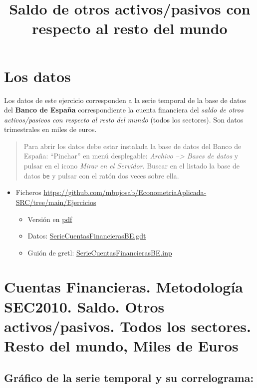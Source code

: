 \documentclass[10pt]{article}
\date{}
\title{Saldo de otros activos/pasivos con respecto al resto del mundo}
\begin{document}
\maketitle
\section*{Los datos}
\label{sec:orgfded846}

\begin{ABSTRACT}
Los datos de este ejercicio corresponden a la serie temporal de la
base de datos del \textbf{Banco de España} correspondiente la cuenta
financiera del \emph{saldo de otros activos/pasivos con respecto al resto
del mundo} (todos los sectores). Son datos trimestrales en miles de
euros.
\end{ABSTRACT}

\begin{quote}
Para abrir los datos debe estar instalada la base de datos del Banco
de España: ``Pinchar'' en menú desplegable: \emph{Archivo --> Bases de datos}
y pulsar en el icono \emph{Mirar en el Servidor}. Buscar en el listado la
base de datos \texttt{be} y pulsar con el ratón dos veces sobre ella.
\end{quote}


\begin{itemize}
\item Ficheros \url{https://github.com/mbujosab/EconometriaAplicada-SRC/tree/main/Ejercicios}
\begin{itemize}
\item Versión en \href{https://github.com/mbujosab/EconometriaAplicada-SRC/blob/main/SerieCuentasFinancierasBE.pdf}{pdf}
\item Datos: \url{SerieCuentasFinancierasBE.gdt}
\item Guión de gretl: \url{SerieCuentasFinancierasBE.inp}
\end{itemize}
\end{itemize}
\section*{Cuentas Financieras. Metodología SEC2010. Saldo. Otros activos/pasivos. Todos los sectores. Resto del mundo, Miles de Euros}
\label{sec:org08ae3d4}

\subsection*{Gráfico de la serie temporal y su correlograma:}
\label{sec:org8143e7c}
\end{document}
